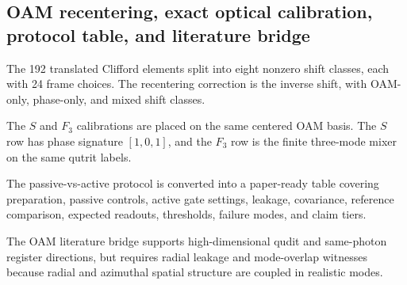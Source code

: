\subsection{OAM recentering, exact optical calibration, protocol table, and literature bridge}
\label{sec:bt1573-bt1576-oam-protocol-literature}

The 192 translated Clifford elements split into eight nonzero shift classes, each with 24 frame choices.  The recentering correction is the inverse shift, with OAM-only, phase-only, and mixed shift classes.

The $S$ and $F_3$ calibrations are placed on the same centered OAM basis.  The $S$ row has phase signature $[1,0,1]$, and the $F_3$ row is the finite three-mode mixer on the same qutrit labels.

The passive-vs-active protocol is converted into a paper-ready table covering preparation, passive controls, active gate settings, leakage, covariance, reference comparison, expected readouts, thresholds, failure modes, and claim tiers.

The OAM literature bridge supports high-dimensional qudit and same-photon register directions, but requires radial leakage and mode-overlap witnesses because radial and azimuthal spatial structure are coupled in realistic modes.
